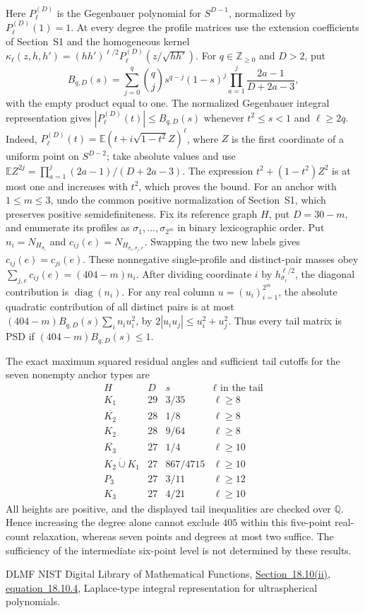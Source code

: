 \documentclass[11pt]{article}
\theoremstyle{remark}
\numberwithin{equation}{section}
\begin{document}
Here $P_\ell^{(D)}$ is the Gegenbauer polynomial for $S^{D-1}$,
normalized by $P_\ell^{(D)}(1)=1$. At every degree the profile matrices
use the extension coefficients of Section~S1 and the homogeneous kernel
$\kappa_\ell(z,h,h')=(hh')^{\ell/2}P_\ell^{(D)}(z/\sqrt{hh'})$.
For $q\in\mathbb Z_{\ge0}$ and $D>2$, put
\[
 B_{q,D}(s)=\sum_{j=0}^q\binom qj s^{q-j}(1-s)^j
 \prod_{a=1}^j\frac{2a-1}{D+2a-3},
\]
with the empty product equal to one.  The normalized Gegenbauer
integral representation \cite[18.10.4]{DLMF} gives
$|P_\ell^{(D)}(t)|\le B_{q,D}(s)$ whenever $t^2\le s<1$
and $\ell\ge2q$.  Indeed,
$P_\ell^{(D)}(t)=\mathbb E(t+i\sqrt{1-t^2}Z)^\ell$,
where $Z$ is the first coordinate of a uniform point on
$S^{D-2}$; take absolute values and use
$\mathbb E Z^{2j}=\prod_{a=1}^j(2a-1)/(D+2a-3)$.
The expression $t^2+(1-t^2)Z^2$ is at most one and increases with
$t^2$, which proves the bound.
For an anchor with $1\le m\le3$, undo the common positive normalization
of Section~S1, which preserves positive semidefiniteness. Fix its
reference graph $H$, put $D=30-m$, and enumerate its profiles as
$\sigma_1,\ldots,\sigma_{2^m}$ in binary lexicographic order. Put
$n_i=N_{H_{\sigma_i}}$ and $c_{ij}(e)=N_{H_{\sigma_i,\sigma_j;e}}$.
Swapping the two new labels gives $c_{ij}(e)=c_{ji}(e)$.
These nonnegative single-profile and distinct-pair masses obey
$\sum_{j,e}c_{ij}(e)=(404-m)n_i$.
After dividing coordinate $i$ by $h_{\sigma_i}^{\ell/2}$, the diagonal contribution is
$\operatorname{diag}(n_i)$.  For any real column $u=(u_i)_{i=1}^{2^m}$, the absolute quadratic
contribution of all distinct pairs is at most
$(404-m)B_{q,D}(s)\sum_i n_i u_i^2$, by
$2|u_iu_j|\le u_i^2+u_j^2$.  Thus every tail matrix is PSD if
$(404-m)B_{q,D}(s)\le1$.

The exact maximum squared residual angles and sufficient tail
cutoffs for the seven nonempty anchor types are
\[
\begin{array}{c|c|c|c}
H&D&s&\ell\text{ in the tail}\\\hline
K_1&29&3/35&\ell\ge8\\
\overline{K_2}&28&1/8&\ell\ge8\\
K_2&28&9/64&\ell\ge8\\
\overline{K_3}&27&1/4&\ell\ge10\\
K_2\mathbin{\dot\cup}K_1&27&867/4715&\ell\ge10\\
P_3&27&3/11&\ell\ge12\\
K_3&27&4/21&\ell\ge10
\end{array}
\]
All heights are positive, and the displayed tail inequalities are
checked over $\mathbb Q$.  Hence increasing the degree alone
cannot exclude $405$ within this five-point real-count relaxation,
whereas seven points and
degrees at most two suffice.  The sufficiency of the intermediate
six-point level is not determined by these results.


\begingroup\small
\begin{thebibliography}{DLMF}
NIST Digital Library of Mathematical Functions,
\href{https://dlmf.nist.gov/18.10.E4}{Section~18.10(ii), equation~18.10.4},
Laplace-type integral representation for ultraspherical polynomials.
\end{thebibliography}
\endgroup
\end{document}
